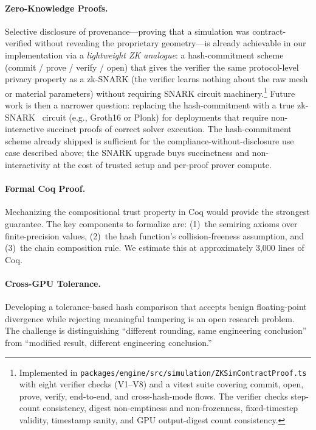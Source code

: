 \documentclass[sigchi-a]{acmart}
\begin{document}
\paragraph{Zero-Knowledge Proofs.}
Selective disclosure of provenance---proving that a simulation was
contract-verified without revealing the proprietary geometry---is
already achievable in our implementation via a \emph{lightweight ZK
analogue}: a hash-commitment scheme (commit / prove / verify / open)
that gives the verifier the same protocol-level privacy property as a
zk-SNARK (the verifier learns nothing about the raw mesh or material
parameters) without requiring SNARK circuit
machinery.\footnote{Implemented in
\texttt{packages/engine/src/simulation/ZKSimContractProof.ts} with eight
verifier checks (V1--V8) and a vitest suite covering commit, open,
prove, verify, end-to-end, and cross-hash-mode flows. The verifier
checks step-count consistency, digest non-emptiness and
non-frozenness, fixed-timestep validity, timestamp sanity, and GPU
output-digest count consistency.} Future work is then a
narrower question: replacing the hash-commitment with a true
zk-SNARK~\cite{gennaro2010} circuit (e.g., Groth16 or Plonk) for
deployments that require non-interactive succinct proofs of correct
solver execution. The hash-commitment scheme already shipped is
sufficient for the compliance-without-disclosure use case described
above; the SNARK upgrade buys succinctness and non-interactivity at
the cost of trusted setup and per-proof prover compute.

\paragraph{Formal Coq Proof.}
Mechanizing the compositional trust property in Coq would provide the
strongest guarantee. The key components to formalize are: (1)~the
semiring axioms over finite-precision values, (2)~the hash function's
collision-freeness assumption, and (3)~the chain composition rule.
We estimate this at approximately 3,000 lines of Coq.

\paragraph{Cross-GPU Tolerance.}
Developing a tolerance-based hash comparison that accepts benign
floating-point divergence while rejecting meaningful tampering is an
open research problem. The challenge is distinguishing ``different
rounding, same engineering conclusion'' from ``modified result,
different engineering conclusion.''
\end{document}
